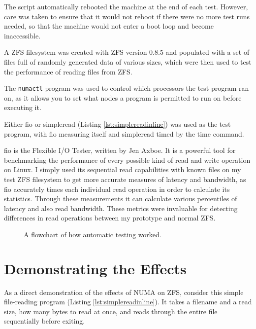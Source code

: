 The script automatically rebooted the machine at the end of each test.
However, care was taken to ensure that it would not reboot if there were no more test runs needed, so that the machine
would not enter a boot loop and become inaccessible.

A ZFS filesystem was created with ZFS version 0.8.5 and populated with a set of files full of randomly generated data
of various sizes, which were then used to test the performance of reading files from ZFS.

The \texttt{numactl} program was used to control which processors the test program ran on, as it allows you to set what nodes a program is permitted
to run on before executing it.



Either fio\cite{fio} or simpleread (Listing \ref{lst:simplereadinline}) was used as the test program, 
with fio measuring itself and simpleread timed by the time command.

fio is the Flexible I/O Tester, written by Jen Axboe\cite{fio}.
It is a powerful tool for benchmarking the performance of every possible kind of read and write operation on Linux.
I simply used its sequential read capabilities with known files on my test ZFS filesystem to get more accurate measures of
latency and bandwidth, as fio accurately times each individual read operation in order to calculate its statistics.
Through these measurements it can calculate various percentiles of latency and also read bandwidth. 
These metrics were invaluable for detecting differences in read operations between my prototype and normal ZFS.

\begin{figure}[H]
    \centering
    \resizebox{!}{0.6\textheight}{}
    \captionsetup{width=0.75\linewidth}
    \caption{A flowchart of how automatic testing worked.}
    \label{fig:testflowchart}
\end{figure}

\section{Demonstrating the Effects}
As a direct demonstration of the effects of NUMA on ZFS, consider this simple file-reading program (Listing \ref{lst:simplereadinline}).
It takes a filename and a read size, how many bytes to read at once, and reads through the entire file sequentially before exiting.

\singlespacing

\doublespacing

